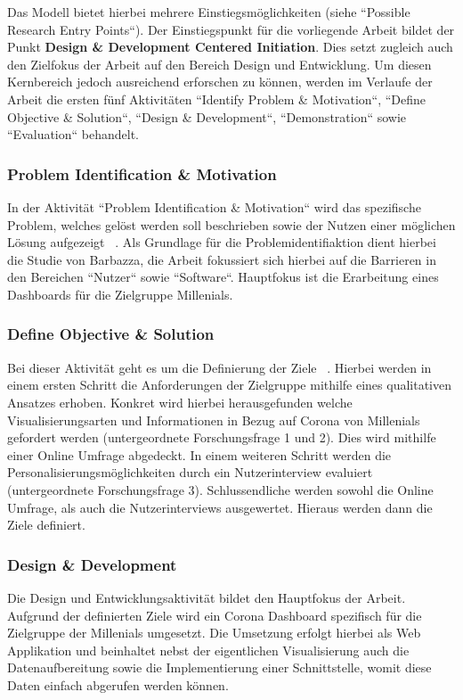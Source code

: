 Das Modell bietet hierbei mehrere Einstiegsmöglichkeiten (siehe ``Possible Research Entry Points``). Der Einstiegspunkt für die vorliegende Arbeit bildet der Punkt \textbf{Design \& Development Centered Initiation}. Dies setzt zugleich auch den Zielfokus der Arbeit auf den Bereich Design und Entwicklung. Um diesen Kernbereich jedoch ausreichend erforschen zu können, werden im Verlaufe der Arbeit die ersten fünf Aktivitäten ``Identify Problem \& Motivation``, ``Define Objective \& Solution``, ``Design \& Development``, ``Demonstration`` sowie ``Evaluation`` behandelt.

\subsubsection{Problem Identification \& Motivation}
In der Aktivität ``Problem Identification \& Motivation`` wird das spezifische Problem, welches gelöst werden soll beschrieben sowie der Nutzen einer möglichen Lösung aufgezeigt ~\citep[S. 52]{peffers}. Als Grundlage für die Problemidentifiaktion dient hierbei die Studie von Barbazza, die Arbeit fokussiert sich hierbei auf die Barrieren in den Bereichen ``Nutzer`` sowie ``Software``. Hauptfokus ist die Erarbeitung eines Dashboards für die Zielgruppe Millenials.

\subsubsection{Define Objective \& Solution}
Bei dieser Aktivität geht es um die Definierung der Ziele ~\citep[S. 52]{peffers}. Hierbei werden in einem ersten Schritt die Anforderungen der Zielgruppe mithilfe eines qualitativen Ansatzes erhoben. Konkret wird hierbei herausgefunden welche Visualisierungsarten und Informationen in Bezug auf Corona von Millenials gefordert werden (untergeordnete Forschungsfrage 1 und 2). Dies wird mithilfe einer Online Umfrage abgedeckt. In einem weiteren Schritt werden die Personalisierungsmöglichkeiten durch ein Nutzerinterview evaluiert (untergeordnete Forschungsfrage 3). Schlussendliche werden sowohl die Online Umfrage, als auch die Nutzerinterviews ausgewertet. Hieraus werden dann die Ziele definiert.

\subsubsection{Design \& Development}
Die Design und Entwicklungsaktivität bildet den Hauptfokus der Arbeit. Aufgrund der definierten Ziele wird ein Corona Dashboard spezifisch für die Zielgruppe der Millenials umgesetzt. Die Umsetzung erfolgt hierbei als Web Applikation und beinhaltet nebst der eigentlichen Visualisierung auch die Datenaufbereitung sowie die Implementierung einer Schnittstelle, womit diese Daten einfach abgerufen werden können.

